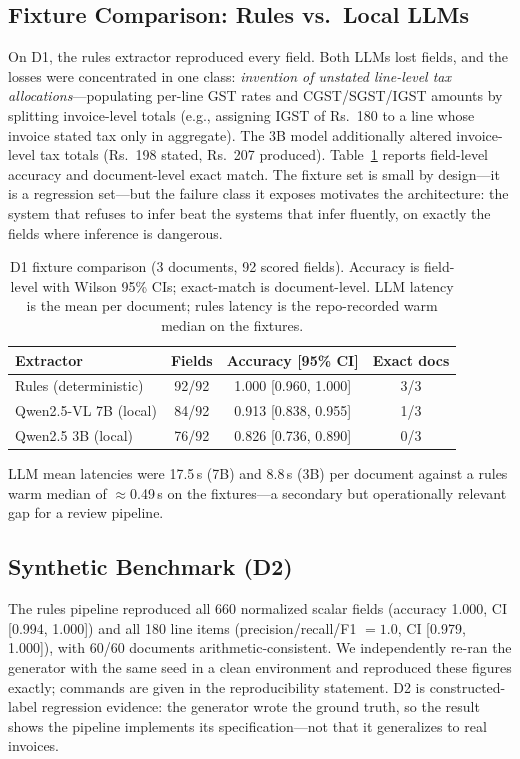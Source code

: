 \documentclass[conference]{IEEEtran}
\begin{document}
\subsection{Fixture Comparison: Rules vs.\ Local LLMs}\label{sec:fixtures}
On D1, the rules extractor reproduced every field. Both LLMs lost fields, and the losses were concentrated in one class: \emph{invention of unstated line-level tax allocations}---populating per-line GST rates and CGST/SGST/IGST amounts by splitting invoice-level totals (e.g., assigning IGST of Rs.~180 to a line whose invoice stated tax only in aggregate). The 3B model additionally altered invoice-level tax totals (Rs.~198 stated, Rs.~207 produced). Table~\ref{tab:fixtures} reports field-level accuracy and document-level exact match. The fixture set is small by design---it is a regression set---but the failure class it exposes motivates the architecture: the system that refuses to infer beat the systems that infer fluently, on exactly the fields where inference is dangerous.

\begin{table}[t]
\caption{D1 fixture comparison (3 documents, 92 scored fields). Accuracy is field-level with Wilson 95\% CIs; exact-match is document-level. LLM latency is the mean per document; rules latency is the repo-recorded warm median on the fixtures.}
\label{tab:fixtures}
\centering
\begin{tabular}{lccc}
\toprule
Extractor & Fields & Accuracy [95\% CI] & Exact docs \\
\midrule
Rules (deterministic) & 92/92 & 1.000 [0.960, 1.000] & 3/3 \\
Qwen2.5-VL 7B (local) & 84/92 & 0.913 [0.838, 0.955] & 1/3 \\
Qwen2.5 3B (local) & 76/92 & 0.826 [0.736, 0.890] & 0/3 \\
\bottomrule
\end{tabular}
\end{table}

LLM mean latencies were 17.5\,s (7B) and 8.8\,s (3B) per document against a rules warm median of $\approx$0.49\,s on the fixtures---a secondary but operationally relevant gap for a review pipeline.

\subsection{Synthetic Benchmark (D2)}
The rules pipeline reproduced all 660 normalized scalar fields (accuracy 1.000, CI [0.994, 1.000]) and all 180 line items (precision/recall/F1 $=1.0$, CI [0.979, 1.000]), with 60/60 documents arithmetic-consistent. We independently re-ran the generator with the same seed in a clean environment and reproduced these figures exactly; commands are given in the reproducibility statement. D2 is constructed-label regression evidence: the generator wrote the ground truth, so the result shows the pipeline implements its specification---not that it generalizes to real invoices.
\end{document}
